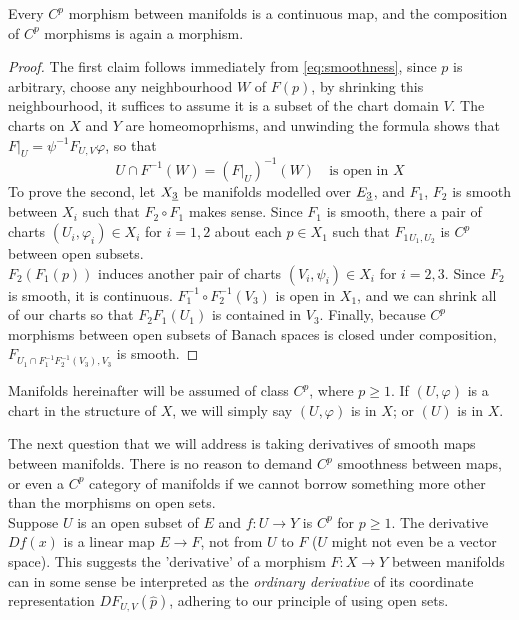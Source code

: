 \documentclass[../main-manifolds.tex]{subfiles}
\begin{document}
%

\begin{wts}\label{prop:smoothness-implies-cont-functorality}
    Every $C^p$ morphism between manifolds is a continuous map, and the composition of $C^p$ morphisms is again a morphism.
\end{wts}
\begin{proof}
    The first claim follows immediately from \cref{eq:smoothness}, since $p$ is arbitrary, choose any neighbourhood $W$ of $F(p)$, by shrinking this neighbourhood, it suffices to assume it is a subset of the chart domain $V$. The charts on $X$ and $Y$ are homeomoprhisms, and unwinding the formula shows that $F\vert_{U} = \psi^{-1}F_{U,V}\varphi$, so that
    \[
        U\cap F^{-1}(W) = (F\vert_U)^{-1}(W)\quad\text{is open in }X
    \]
    To prove the second, let $\UL{X}[3]$ be manifolds modelled over $\UL{E}[3]$, and $F_1$, $F_2$ is smooth between $X_i$ such that $F_2\circ F_1$ makes sense. Since $F_1$ is smooth, there a pair of charts $(U_i,\varphi_i)\in X_i$ for $i = 1,2$ about each $p\in X_1$ such that $F_1{_{U_1,U_2}}$ is $C^p$ between open subsets.\\

    $F_2(F_1(p))$ induces another pair of charts $(V_i,\psi_i)\in X_i$ for $i=2,3$. Since $F_2$ is smooth, it is continuous. $F_1^{-1}\circ F_2^{-1}(V_3)$ is open in $X_1$, and we can shrink all of our charts so that $F_2F_1(U_1)$ is contained in $V_3$. Finally, because $C^p$ morphisms between open subsets of Banach spaces is closed under composition, $F_{U_1\cap F_1^{-1}F_2^{-1}(V_3), V_3}$ is smooth.
\end{proof}
\begin{remark}
    Manifolds hereinafter will be assumed of class $C^p$, where $p\geq 1$. If $(U,\varphi)$ is a chart in the structure of $X$, we will simply say $(U,\varphi)$ is in $X$; or $(U)$ is in $X$.
\end{remark}
The next question that we will address is taking derivatives of smooth maps between manifolds. There is no reason to demand $C^p$ smoothness between maps, or even a $C^p$ category of manifolds if we cannot borrow something more other than the morphisms on open sets.\\

Suppose $U$ is an open subset of $E$ and $f: U\to Y$ is $C^p$ for $p\geq 1$. The derivative $Df(x)$ is a linear map $E\to F$, not from $U$ to $F$ ($U$ might not even be a vector space). This suggests the 'derivative' of a morphism $F: X\to Y$ between manifolds can in some sense be interpreted as the \emph{ordinary derivative} of its coordinate representation $DF_{U,V}(\hat{p})$, adhering to our principle of using open sets.\\
\end{document}
